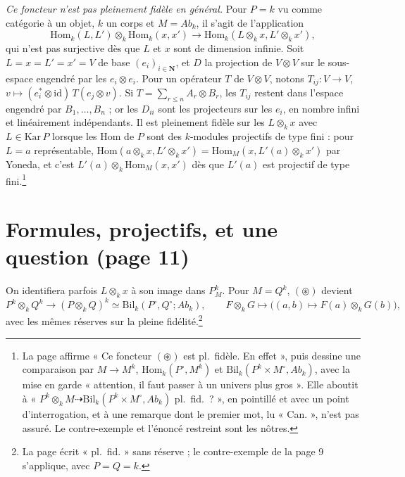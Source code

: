 \documentclass[11pt,a4paper]{article}
\begin{document}
\emph{Ce foncteur n'est pas pleinement fidèle en général.} Pour $P = k$ vu comme
catégorie à un objet, $k$ un corps et $M = Ab_{k}$, il s'agit de l'application
\[
\mathrm{Hom}_{k}(L, L') \otimes_{k} \mathrm{Hom}_{k}(x, x') \longrightarrow
\mathrm{Hom}_{k}(L \otimes_{k} x, L' \otimes_{k} x'),
\]
qui n'est pas surjective dès que $L$ et $x$ sont de dimension infinie. Soit
$L = x = L' = x' = V$ de base $(e_{i})_{i \in \mathbf{N}}$, et $D$ la projection
de $V \otimes V$ sur le sous-espace engendré par les $e_{i} \otimes e_{i}$.
Pour un opérateur $T$ de $V \otimes V$, notons $T_{ij} : V \to V$,
$v \mapsto (e_{i}^{*} \otimes \mathrm{id})\,T(e_{j} \otimes v)$. Si
$T = \sum_{r \leq n} A_{r} \otimes B_{r}$, les $T_{ij}$ restent dans l'espace
engendré par $B_{1}, \ldots, B_{n}$ ; or les $D_{ii}$ sont les projecteurs
sur les $e_{i}$, en nombre infini et linéairement indépendants. Il est
pleinement fidèle sur les $L \otimes_{k} x$ avec $L \in \mathrm{Kar}\, P$ lorsque
les $\mathrm{Hom}$ de $P$ sont des $k$-modules projectifs de type fini : pour
$L = a$ représentable, $\mathrm{Hom}(a \otimes_{k} x, L' \otimes_{k} x') =
\mathrm{Hom}_{M}(x, L'(a) \otimes_{k} x')$ par Yoneda, et c'est
$L'(a) \otimes_{k} \mathrm{Hom}_{M}(x, x')$ dès que $L'(a)$ est projectif de
type fini.\footnote{La page affirme « Ce foncteur $(\circledast)$ est pl.\
fidèle. En effet », puis dessine une comparaison par $M \to M^{k}$,
$\mathrm{Hom}_{k}(P^{\circ}, M^{k})$ et $\mathrm{Bil}_{k}(P^{k} \times M^{\circ},
Ab_{k})$, avec la mise en garde « attention, il faut passer à un univers plus
gros ». Elle aboutit à « $P^{k} \otimes_{k} M \dashrightarrow
\mathrm{Bil}_{k}(P^{k} \times M^{\circ}, Ab_{k})$ pl.\ fid.\ ? », en pointillé et
avec un point d'interrogation, et à une remarque dont le premier mot, lu
« Can. », n'est pas assuré. Le contre-exemple et l'énoncé restreint sont les
nôtres.}

\section*{Formules, projectifs, et une question (page 11)}

On identifiera parfois $L \otimes_{k} x$ à son image dans $P^{k}_{M}$. Pour
$M = Q^{k}$, $(\circledast)$ devient
\[
P^{k} \otimes_{k} Q^{k} \longrightarrow (P \otimes_{k} Q)^{k} \simeq
\mathrm{Bil}_{k}(P^{\circ}, Q^{\circ}; Ab_{k}),
\qquad
F \otimes_{k} G \longmapsto \bigl((a, b) \mapsto F(a) \otimes_{k} G(b)\bigr),
\]
avec les mêmes réserves sur la pleine fidélité.\footnote{La page écrit
« pl.\ fid. » sans réserve ; le contre-exemple de la page 9 s'applique, avec
$P = Q = k$.}
\end{document}
